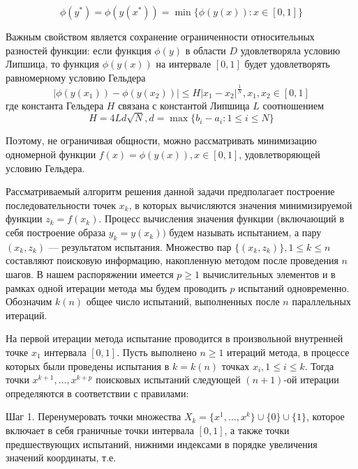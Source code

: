 \documentclass[a4paper]{article}
\begin{document}
\begin{displaymath}
\label{oneDimTask}
\phi(y^*)=\phi(y(x^*))=\min\{\phi(y(x)):x\in [0,1]\}
\end{displaymath}
\par
Важным свойством является сохранение ограниченности относительных разностей функции: если функция \(\phi(y)\) в области \(D
\) удовлетворяла условию Липшица, то функция \(\phi(y(x))\) на интервале \([0,1]\) будет удовлетворять равномерному условию Гельдера
\begin{displaymath}
\label{holder}
|\phi(y(x_1))-\phi(y(x_2))|\leqslant H{|x_1-x_2|}^{\frac{1}{N}},x_1,x_2\in[0,1]
\end{displaymath}
где константа Гельдера \(H\) связана с константой Липшица \(L\) соотношением 
\begin{displaymath}
H=4Ld\sqrt{N},d=\max\{b_i-a_i:1\leqslant i\leqslant N\}
\end{displaymath}
\par
Поэтому, не ограничивая общности, можно рассматривать минимизацию одномерной функции  \(f(x)=\phi(y(x)), x\in[0,1]\), удовлетворяющей условию Гельдера.
\par
Рассматриваемый алгоритм решения данной задачи предполагает построение последовательности точек \(x_k\), в которых вычисляются значения минимизируемой функции \(z_k = f(x_k)\). Процесс вычисления значения функции (включающий в себя построение образа \(y_k=y(x_k))\) будем называть испытанием, а пару \((x_k,z_k)\) --- результатом испытания. Множество пар \(\{(x_k,z_k)\}, 1\leqslant k\leqslant n\) составляют поисковую информацию, накопленную методом после проведения \(n\) шагов. В нашем распоряжении имеется \(p\geqslant 1\) вычислительных элементов и в рамках одной итерации метода мы будем проводить \(p\) испытаний одновременно. Обозначим \(k(n)\) общее число испытаний, выполненных после \(n\) параллельных итераций.
\par
На первой итерации метода испытание проводится в произвольной внутренней точке \(x_1\) интервала \([0,1]\). Пусть выполнено \(n\geqslant 1\) итераций метода, в процессе которых были проведены испытания в \(k = k(n)\) точках \(x_i, 1\leqslant i\leqslant k\). Тогда точки \(x^{k+1},\dotsc,x^{k+p}\) поисковых испытаний следующей \((n+1)\)-ой итерации определяются в соответствии с правилами:
\par
Шаг 1. Перенумеровать точки множества \(X_k=\{x^1,\dotsc,x^k\}\cup\{0\}\cup\{1\}\), которое включает в себя граничные точки интервала \([0,1]\), а также точки предшествующих испытаний, нижними индексами в порядке увеличения значений координаты, т.е.
\end{document}
